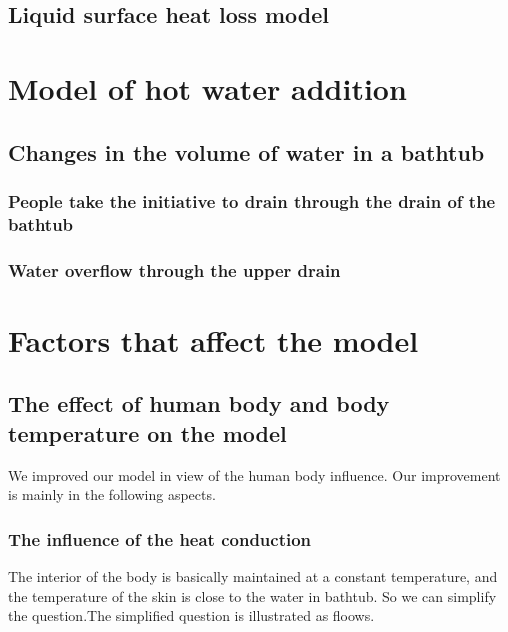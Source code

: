 \documentclass{mcmthesis}
\begin{document}
\subsection{Liquid surface heat loss model}%

\section{Model of hot water addition}
\subsection{Changes in the volume of water in a bathtub}

\subsubsection{People take the initiative to drain through the drain of the bathtub}

\subsubsection{Water overflow through the upper drain}
\section{Factors that affect the model}
\subsection{The effect of human body and body temperature on the model}
We improved our model in view of the human body influence. Our improvement is mainly in the following aspects.
\subsubsection{The influence of the heat conduction}%
The interior of the body is basically maintained at a constant temperature, and the temperature of the skin is close to the water in bathtub. So we can simplify the question.The simplified question is illustrated as floows.\\
\end{document}
